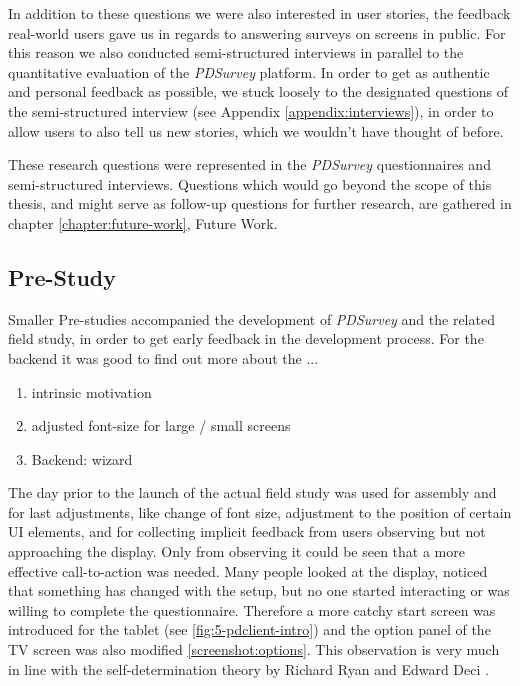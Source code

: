 	In addition to these questions we were also interested in user stories, the feedback real-world users gave us in regards to answering surveys on screens in public. For this reason we also conducted semi-structured interviews in parallel to the quantitative evaluation of the \textit{PDSurvey} platform. In order to get as authentic and personal feedback as possible, we stuck loosely to the designated questions of the semi-structured interview (see Appendix \ref{appendix:interviews}), in order to allow users to also tell us new stories, which we wouldn't have thought of before.

	These research questions were represented in the \textit{PDSurvey} questionnaires and semi-structured interviews. Questions which would go beyond the scope of this thesis, and might serve as follow-up questions for further research, are gathered in chapter \ref{chapter:future-work}, Future Work.




\clearpage
\subsection{Pre-Study}

	Smaller Pre-studies accompanied the development of \textit{PDSurvey} and the related field study, in order to get early feedback in the development process. 
	For the backend it was good to find out more about the ...


	\begin{enumerate}
	\item intrinsic motivation
	\item adjusted font-size for large / small screens
	\item Backend: wizard
	\end{enumerate}



	The day prior to the launch of the actual field study was used for assembly and for last adjustments, like change of font size, adjustment to the position of certain UI elements, and for collecting implicit feedback from users observing but not approaching the display. Only from observing it could be seen that a more effective call-to-action was needed. Many people looked at the display, noticed that something has changed with the setup, but no one started interacting or was willing to complete the questionnaire. Therefore a more catchy start screen was introduced for the tablet (see \ref{fig:5-pdclient-intro}) and the option panel of the TV screen was also modified \ref{screenshot:options}. This observation is very much in line with the self-determination theory by Richard Ryan and Edward Deci \cite{ryan2000self}.


